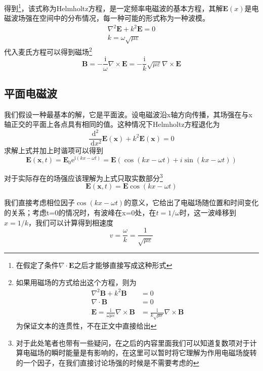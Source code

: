         得到\footnote{在假定了条件$\nabla \cdot \boldsymbol{E}$之后才能够直接写成这种形式}，该式称为Helmholtz方程，是一定频率电磁波的基本方程，其解$\boldsymbol{E}(x)$是电磁波场强在空间中的分布情况，每一种可能的形式称为一种波模。
        \begin{equation}
            \begin{gathered}
            \nabla^{2} \boldsymbol{E}+k^{2} \boldsymbol{E}=0 \\
            k=\omega \sqrt{\mu \varepsilon}
            \end{gathered}
            \end{equation} 
        代入麦氏方程可以得到磁场\footnote{如果用磁场的方式给出这个方程，则为\[\begin{aligned}
            \nabla^{2} \boldsymbol{B}+k^{2} \boldsymbol{B} &=0 \\
            \nabla \cdot \boldsymbol{B} &=0 \\
            \boldsymbol{E}=\frac{\mathrm{i}}{\omega \mu \varepsilon} \nabla \times \boldsymbol{B} &=\frac{\mathrm{i}}{k \sqrt{\mu \varepsilon}} \nabla \times \boldsymbol{B}
            \end{aligned}\]
            为保证文本的连贯性，不在正文中直接给出}
        \begin{equation}
            \boldsymbol{B}=-\frac{\mathrm{i}}{\omega} \nabla \times \boldsymbol{E}=-\frac{\mathrm{i}}{k} \sqrt{\mu \varepsilon} \nabla \times \boldsymbol{E}
        \end{equation}
    \subsection{平面电磁波}      
        我们假设一种最基本的解，它是平面波。设电磁波沿x轴方向传播，其场强在与x轴正交的平面上各点具有相同的值。这种情况下Helmholtz方程退化为
        \begin{equation}
            \frac{\mathrm{d}^{2}}{\mathrm{~d} x^{2}} \boldsymbol{E}(\boldsymbol{x})+k^{2} \boldsymbol{E}(\boldsymbol{x})=0
        \end{equation}
        求解上式并加上时谐项可以得到
        \begin{equation}
            \boldsymbol{E}(\boldsymbol{x}, t)=\boldsymbol{E}_{0} \mathrm{e}^{\mathrm{i}(k x-\omega t)} = \boldsymbol{E}(\cos(kx-\omega t)+i \sin(kx-\omega t))
        \end{equation}

        对于实际存在的场强应该理解为上式只取实数部分\footnote{对于此处笔者也带有一些疑问，在之后的内容里面我们可以知道复数项对于计算电磁场的瞬时能量是有影响的，在这里可以暂时将它理解为作用电磁场旋转的一个因子，在我们直接讨论场强的时候是不需要考虑的}
        \begin{equation}
            \boldsymbol{E}(\boldsymbol{x}, t)= \boldsymbol{E} \cos(kx-\omega t)
        \end{equation}

        我们直接考虑相位因子$\cos (kx - \omega t)$的意义，它给出了电磁场随位置和时间变化的关系；考虑t=0的情况时，有波峰在x=0处，在$t=1/\omega$时，这一波峰移到$x=1/k$，我们可以计算得到相速度
        \begin{equation}
            v=\frac{\omega}{k}=\frac{1}{\sqrt{\mu \varepsilon}}
        \end{equation}    
        

        